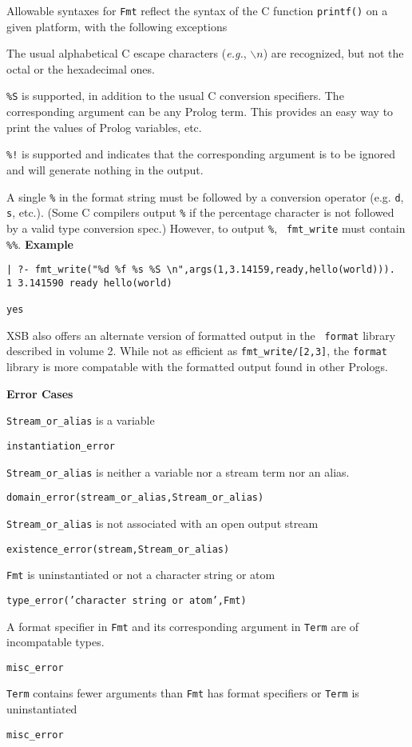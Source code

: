 \begin{description}
Allowable syntaxes for {\tt Fmt} reflect the syntax of the C function
{\tt printf()} on a given platform, with the following exceptions
%
\bi
\item The usual alphabetical C escape characters ({\it e.g.},
  $\backslash n$) are recognized, but not the octal or the hexadecimal
  ones.
\item {\tt \%S} is supported, in addition to the usual C conversion
  specifiers.  The corresponding argument can be any Prolog term. This
  provides an easy way to print the values of Prolog variables, etc.
\item {\tt \%!} is supported and indicates that the corresponding
  argument is to be ignored and will generate nothing in the output.
\item A single {\tt \%} in the format string must be followed by a
  conversion operator (e.g. {\tt d}, {\tt s}, etc.). (Some C compilers
  output {\tt \%} if the percentage character is not followed by a
  valid type conversion spec.)  However, to output {\tt \%}, {\tt
    fmt\_write} must contain {\tt \%\%}.
\ei    
%
{\bf Example}
{\small
\begin{verbatim}
| ?- fmt_write("%d %f %s %S \n",args(1,3.14159,ready,hello(world))).
1 3.141590 ready hello(world)

yes
\end{verbatim}
}
%
XSB also offers an alternate version of formatted output in the {\tt
  format} library described in volume 2.  While not as efficient as
{\tt fmt\_write/[2,3]}, the {\tt format} library is more compatable
with the formatted output found in other Prologs.

{\bf Error Cases}
\bi
\item 	{\tt Stream\_or\_alias} is a variable
\bi
\item {\tt instantiation\_error}
\ei
\item 	{\tt Stream\_or\_alias} is neither a variable nor a stream term nor an alias.
\bi
\item 	{\tt domain\_error(stream\_or\_alias,Stream\_or\_alias)}
\ei
\item 	{\tt Stream\_or\_alias} is not associated with an open output stream
\bi
\item 	{\tt existence\_error(stream,Stream\_or\_alias)}
\ei
\item {\tt Fmt} is uninstantiated or not a character string or atom
\bi
\item   {\tt type\_error('character string or atom',Fmt)}
\ei
\item A format specifier in {\tt Fmt} and its corresponding argument
  in {\tt Term} are of incompatable types.
\bi
\item   {\tt misc\_error}
\ei
\item {\tt Term} contains fewer arguments than {\tt Fmt} has format
  specifiers or {\tt Term} is uninstantiated
\bi
\item   {\tt misc\_error}
\ei
\ei


\end{description}

